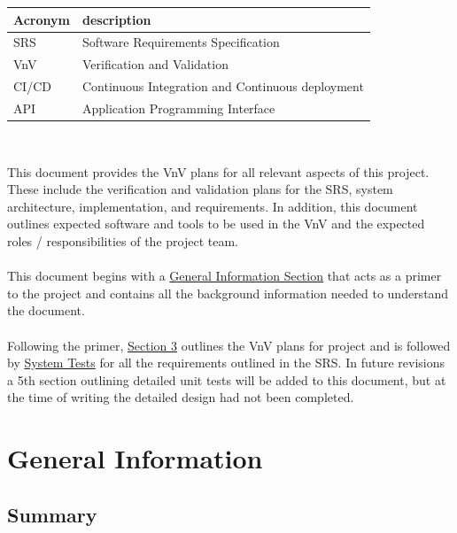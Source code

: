 \documentclass[12pt, titlepage]{article}
\begin{document}
\renewcommand{\arraystretch}{1.2}
\begin{tabular}{l l} 
  \toprule		
  \textbf{Acronym} & \textbf{description}\\
  \midrule 
  SRS & Software Requirements Specification\\
  VnV & Verification and Validation\\
  CI/CD & Continuous Integration and Continuous deployment\\   
  API & Application Programming Interface\\
  \bottomrule
\end{tabular}\\



\newpage


This document provides the VnV plans for all relevant aspects of this project. These include the verification and validation plans for the SRS, system architecture, implementation, and requirements. In addition, this document outlines expected software and tools to be used in the VnV and the expected roles / responsibilities of the project team. \\\\This document begins with a 
\hyperref[sec:generalInfo]{General Information Section} that acts as a primer to the project and contains all the background information needed to understand the document.\\\\Following the primer, \hyperref[section:JustPlan]{Section 3} outlines the VnV plans for project and is followed by \hyperref[section:systemTests]{System Tests} for all the requirements outlined in the SRS. In future revisions a 5th section outlining detailed unit tests will be added to this document, but at the time of writing the detailed design had not been completed.

\section{General Information}
\label{sec:generalInfo}
\subsection{Summary}
\end{document}

